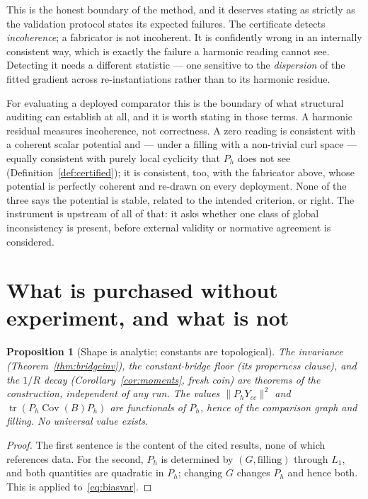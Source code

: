 \documentclass[11pt,a4paper]{article}
\newtheorem{proposition}{Proposition}
\theoremstyle{definition}
\theoremstyle{remark}
\newcommand{\Cov}{\operatorname{Cov}}
\newcommand{\tr}{\operatorname{tr}}
\newcommand{\Ph}{P_h}
\begin{document}
This is the honest boundary of the method, and it deserves stating as strictly as
the validation protocol states its expected failures. The certificate detects
\emph{incoherence}; a fabricator is not incoherent. It is confidently wrong in an
internally consistent way, which is exactly the failure a harmonic reading cannot
see. Detecting it needs a different statistic --- one sensitive to the
\emph{dispersion} of the fitted gradient across re-instantiations rather than to
its harmonic residue.

For evaluating a deployed comparator this is the boundary of what structural
auditing can establish at all, and it is worth stating in those terms. A harmonic
residual measures incoherence, not correctness. A zero reading is consistent with
a coherent scalar potential and --- under a filling with a non-trivial curl space
--- equally consistent with purely local cyclicity that $\Ph$ does not see
(Definition~\ref{def:certified}); it is consistent, too, with the fabricator above, whose potential
is perfectly coherent and re-drawn on every deployment. None of the three says
the potential is stable, related to the intended criterion, or right. The
instrument is upstream of all of that: it asks whether one class of global
inconsistency is present, before external validity or normative agreement is
considered.

\section{What is purchased without experiment, and what is not}

\begin{proposition}[Shape is analytic; constants are topological]\label{prop:shapeanalytic}
The invariance (Theorem~\ref{thm:bridgeinv}), the constant-bridge floor (its properness clause), and the $1/R$ decay (Corollary~\ref{cor:moments}, fresh coin) are theorems of the construction, independent of any run. The values $\|\Ph Y_{cc}\|^2$ and $\tr(\Ph\Cov(B)\Ph)$ are functionals of $\Ph$, hence of the comparison graph and filling. No universal value exists.
\end{proposition}
\begin{proof}
The first sentence is the content of the cited results, none of which references data. For the second, $\Ph$ is determined by $(G,\text{filling})$ through $L_1$, and both quantities are quadratic in $\Ph$; changing $G$ changes $\Ph$ and hence both. This is \cite[Principle 3]{bradsher2026} applied to~\eqref{eq:biasvar}.
\end{proof}
\end{document}
